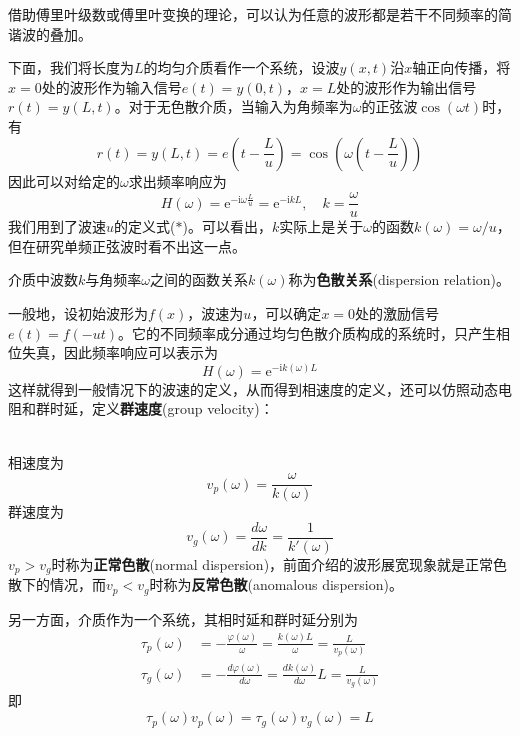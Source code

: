 借助傅里叶级数或傅里叶变换的理论，可以认为任意的波形都是若干不同频率的简谐波的叠加。

下面，我们将长度为$L$的均匀介质看作一个系统，设波$y(x,t)$沿$x$轴正向传播，将$x=0$处的波形作为输入信号$e(t)=y(0,t)$，$x=L$处的波形作为输出信号$r(t)=y(L,t)$。对于无色散介质，当输入为角频率为$\omega$的正弦波$\cos(\omega t)$时，有
\[r(t)=y(L,t)=e\left(t - \frac{L}{u}\right)=\cos\left(\omega \left(t-\frac{L}{u}\right)\right)\]
因此可以对给定的$\omega$求出频率响应为
\[H(\omega)=\mathrm{e}^{-\mathrm{i}\omega \frac{L}{u}}=\mathrm{e}^{-\mathrm{i}kL},\quad k=\frac{\omega}{u}\]
我们用到了波速$u$的定义式($*$)。可以看出，$k$实际上是关于$\omega$的函数$k(\omega)=\omega/u$，但在研究单频正弦波时看不出这一点。
\begin{definition}[色散关系]
    介质中波数$k$与角频率$\omega$之间的函数关系$k(\omega)$称为\textbf{色散关系}(dispersion relation)。
\end{definition}

一般地，设初始波形为$f(x)$，波速为$u$，可以确定$x=0$处的激励信号$e(t)=f(-ut)$。它的不同频率成分通过均匀色散介质构成的系统时，只产生相位失真，因此频率响应可以表示为
\[H(\omega)=\mathrm{e}^{-\mathrm{i}k(\omega)L}\]
这样就得到一般情况下的波速的定义，从而得到相速度的定义，还可以仿照动态电阻和群时延，定义\textbf{群速度}(group velocity)：
\begin{definition}[相速度和群速度]
    \quad\\
    相速度为\[v_p(\omega)=\frac{\omega}{k(\omega)}\]
    群速度为\[v_g(\omega)=\frac{d\omega}{dk}=\frac{1}{k'(\omega)}\]
    $v_p>v_g$时称为\textbf{正常色散}(normal dispersion)，前面介绍的波形展宽现象就是正常色散下的情况，而$v_p<v_g$时称为\textbf{反常色散}(anomalous dispersion)。
\end{definition}
另一方面，介质作为一个系统，其相时延和群时延分别为
\begin{align*}
    \tau_p(\omega)&=-\frac{\varphi(\omega)}{\omega}=\frac{k(\omega)L}{\omega}=\frac{L}{v_p(\omega)}\\
    \tau_g(\omega)&=-\frac{d\varphi(\omega)}{d\omega}=\frac{dk(\omega)}{d\omega}L=\frac{L}{v_g(\omega)}
\end{align*}
即\[\tau_p(\omega)v_p(\omega)=\tau_g(\omega)v_g(\omega)=L\]


